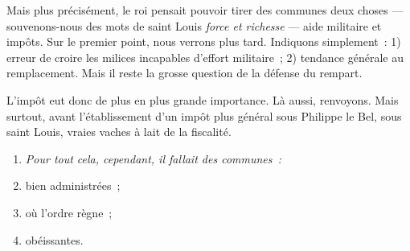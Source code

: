 \documentclass[french,twoside]{book} %
\newlength{\listmod}
\newcommand{\listhead}[1]{\hspace{-1\listmod}\emph{#1}}
\begin{document}
Mais plus précisément, le roi pensait pouvoir tirer des communes deux choses — souvenons-nous des mots de saint Louis \emph{force et richesse} — aide militaire et impôts. Sur le premier point, nous verrons plus tard. Indiquons simplement : 1) erreur de croire les milices incapables d’effort militaire ; 2) tendance générale au remplacement. Mais il reste la grosse question de la défense du rempart.\par
L’impôt eut donc de plus en plus grande importance. Là aussi, renvoyons. Mais surtout, avant l’établissement d’un impôt plus général sous Philippe le Bel, sous saint Louis, vraies vaches à lait de la fiscalité.\par

\begin{enumerate}[itemsep=0pt,]
\item[]\listhead{Pour tout cela, cependant, il fallait des communes :}
\item bien administrées ;
\item où l’ordre règne ;
\item obéissantes.
\end{enumerate}
\end{document}
